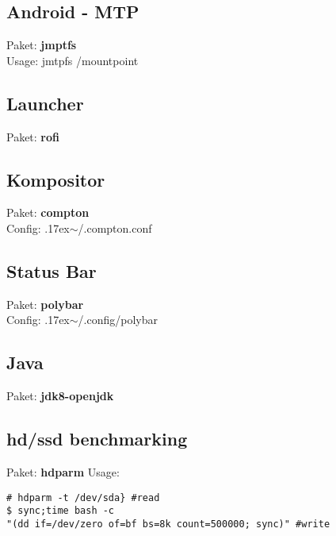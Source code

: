\subsection{Android - MTP}
Paket: \textbf{jmptfs} \\ 
Usage: jmtpfs /mountpoint  

\subsection{Launcher}
Paket: \textbf{rofi}

\subsection{Kompositor}
Paket: \textbf{compton}\\
Config: {{\raise.17ex\hbox{$\scriptstyle\mathtt{\sim}$}}/.compton.conf} 

\subsection{Status Bar}
Paket: \textbf{polybar} \\
Config: {{\raise.17ex\hbox{$\scriptstyle\mathtt{\sim}$}}/.config/polybar}

\subsection{Java}
Paket: \textbf{jdk8-openjdk}

\subsection{hd/ssd benchmarking}
Paket: \textbf{hdparm}
Usage:
\begin{lstlisting}[style=Bash]
# hdparm -t /dev/sda} #read
$ sync;time bash -c 
"(dd if=/dev/zero of=bf bs=8k count=500000; sync)" #write
\end{lstlisting}



